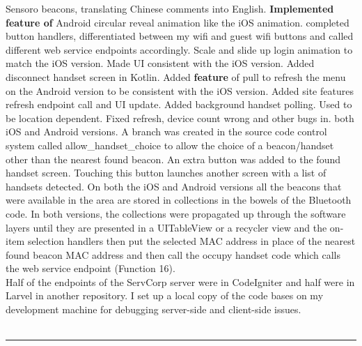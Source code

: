 \documentclass{article}
\begin{document}
Sensoro beacons, translating Chinese comments into English. {\bf Implemented feature of} Android circular reveal animation like the iOS animation. completed button handlers, differentiated between my wifi and guest wifi buttons and called different web service endpoints accordingly. Scale and slide up login animation to match the iOS version. Made UI consistent with the iOS version. Added disconnect handset screen in Kotlin. Added {\bf feature} of pull to refresh the menu on the Android version to be consistent with the iOS version. Added site features refresh endpoint call and UI update. Added background handset polling. Used to be location dependent.  Fixed refresh, device count wrong and other bugs in. both iOS and Android versions.  A branch was created in the source code control system called allow\_handset\_choice to allow the choice of a beacon/handset other than the nearest found beacon.  An extra button was added to the found handset screen. Touching this button launches another screen with a list of handsets detected.  On both the iOS and Android versions all the beacons that were available in the area are stored in collections in the bowels of the Bluetooth code. In both versions, the collections were propagated up through the software layers until they are presented in a UITableView or a recycler view and the on-item selection handlers then put the selected MAC address in place of the nearest found beacon MAC address and then call the occupy handset code which calls the web service endpoint (Function 16).\\

Half of the endpoints of the ServCorp server were in CodeIgniter and half were in Larvel in another repository. I set up a local copy of the code bases on my development machine for debugging server-side and client-side issues.\ 
\\
\\

\noindent\hfil\rule{0.5\textwidth}{.4pt}\hfil
\\

\end{document}
